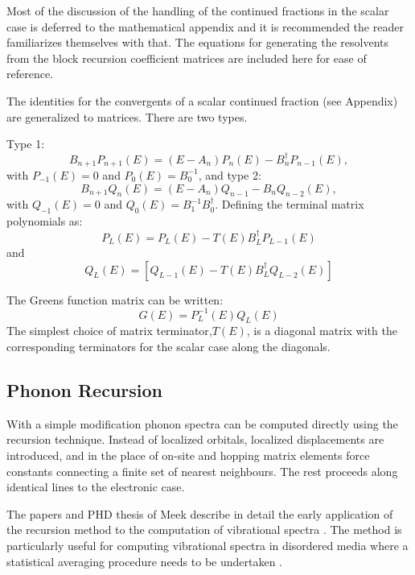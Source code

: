 Most of the discussion 
of the handling of the continued fractions in the scalar case
is deferred to the mathematical appendix and it is recommended 
the reader familiarizes themselves with that. The equations for
generating the resolvents from the block 
recursion coefficient matrices are 
included here for ease of reference.

The identities for the convergents of a scalar continued fraction (see Appendix)
are generalized to matrices. There are two types.

Type 1:
\begin{equation}
B_{n+1}P_{n+1}(E) = (E-A_{n})P_{n}(E) -B^{\dagger}_{n}P_{n-1}(E),
\end{equation}
%
with $P_{-1}(E)=0$ and $P_{0}(E)=B_{0}^{-1}$,
and type 2:
%
\begin{equation}
B_{n+1}Q_{n}(E) = (E-A_{n})Q_{n-1} -B_{n}Q_{n-2}(E),
\end{equation}
%
with $Q_{-1}(E)=0$ and $Q_{0}(E)=B_{1}^{-1}B^{\dagger}_{0}$.
%
Defining the terminal matrix polynomials as:
\begin{equation}
P_{L}(E) = P_{L}(E) -T(E)B_{L}^{\dagger}P_{L-1}(E)
\end{equation}
and
\begin{equation}
Q_{L}(E)=[Q_{L-1}(E) -T(E)B_{L}^{\dagger}Q_{L-2}(E)]
\end{equation}

The Greens function matrix can be written:
%
\begin{equation}
G(E) = P_{L}^{-1}(E)Q_{L}(E)
\end{equation}
%
The simplest choice of matrix terminator,$T(E)$, 
is a diagonal matrix with the corresponding 
terminators for the scalar case along the diagonals.

\subsection{Phonon Recursion}
\label{sec:recphonon}
With a simple modification phonon spectra can be computed directly 
using the recursion technique. Instead of localized orbitals, localized 
displacements are introduced, and in the place of on-site and hopping
matrix elements force constants connecting a finite set of nearest neighbours.
The rest proceeds along identical lines to the electronic case.

The papers and PHD thesis of Meek describe in detail the 
early application of the recursion method to the computation of 
vibrational spectra \cite{meek76, meek78}. 
The method is particularly useful for
computing vibrational spectra in disordered media 
where a statistical averaging procedure needs to be 
undertaken \cite{mookerjee04}.

